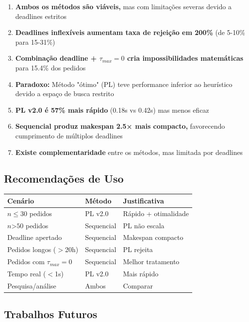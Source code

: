 \documentclass[11pt,a4paper]{article}
\begin{document}
\begin{enumerate}
    \item \textbf{Ambos os métodos são viáveis,} mas com limitações severas devido a deadlines estritos
    \item \textbf{Deadlines inflexíveis aumentam taxa de rejeição em 200\%} (de 5-10\% para 15-31\%)
    \item \textbf{Combinação deadline + $\tau_{max} = 0$ cria impossibilidades matemáticas} para 15.4\% dos pedidos
    \item \textbf{Paradoxo:} Método "ótimo" (PL) teve performance inferior ao heurístico devido a espaço de busca restrito
    \item \textbf{PL v2.0 é 57\% mais rápido} (0.18s vs 0.42s) mas menos eficaz
    \item \textbf{Sequencial produz makespan 2.5× mais compacto,} favorecendo cumprimento de múltiplos deadlines
    \item \textbf{Existe complementaridade} entre os métodos, mas limitada por deadlines
\end{enumerate}

\subsection{Recomendações de Uso}

\begin{center}
\begin{tabular}{lll}
\toprule
\textbf{Cenário} & \textbf{Método} & \textbf{Justificativa} \\
\midrule
$n \leq 30$ pedidos & PL v2.0 & Rápido + otimalidade \\
$n $>$ 50$ pedidos & Sequencial & PL não escala \\
Deadline apertado & Sequencial & Makespan compacto \\
Pedidos longos ($>$20h) & Sequencial & PL rejeita \\
Pedidos com $\tau_{max} = 0$ & Sequencial & Melhor tratamento \\
Tempo real ($<$1s) & PL v2.0 & Mais rápido \\
Pesquisa/análise & Ambos & Comparar \\
\bottomrule
\end{tabular}
\end{center}

\subsection{Trabalhos Futuros}
\end{document}
